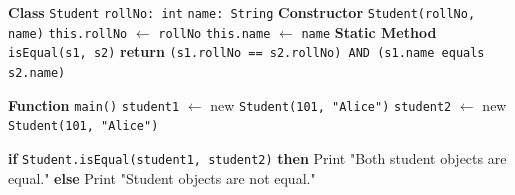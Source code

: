 \begin{algorithm}[H]
\caption{Check Equality of Two Student Objects}
\begin{algorithmic}[1]

\STATE \textbf{Class} \texttt{Student}
\STATE \hspace{1em} \texttt{rollNo: int}
\STATE \hspace{1em} \texttt{name: String}
\STATE
\STATE \textbf{Constructor} \texttt{Student(rollNo, name)}
\STATE \hspace{1em} \texttt{this.rollNo} $\gets$ \texttt{rollNo}
\STATE \hspace{1em} \texttt{this.name} $\gets$ \texttt{name}
\STATE
\STATE \textbf{Static Method} \texttt{isEqual(s1, s2)}
\STATE \hspace{1em} \textbf{return} \texttt{(s1.rollNo == s2.rollNo) AND (s1.name equals s2.name)}

\STATE

\STATE \textbf{Function} \texttt{main()}
\STATE \hspace{1em} \texttt{student1} $\gets$ new \texttt{Student(101, "Alice")}
\STATE \hspace{1em} \texttt{student2} $\gets$ new \texttt{Student(101, "Alice")}

\STATE \hspace{1em} \textbf{if} \texttt{Student.isEqual(student1, student2)} \textbf{then}
\STATE \hspace{2em} Print "Both student objects are equal."
\STATE \hspace{1em} \textbf{else}
\STATE \hspace{2em} Print "Student objects are not equal."

\end{algorithmic}
\end{algorithm}